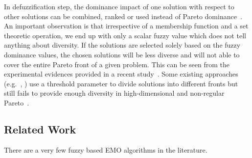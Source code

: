 \documentclass[review]{elsarticle}
\begin{document}
In defuzzification step, the dominance impact of one solution with respect to other solutions can be combined, ranked 
or used instead of Pareto 
dominance~\citep{he2014fuzzy,he2012new,koppen2005fuzzy,farina2004fuzzy,fuzzynasir}. An important observation is that irrespective of a membership function and a set theoretic operation, we end up with only a scalar fuzzy value which does not tell anything about diversity. If the solutions are selected solely based on the fuzzy dominance values, the chosen solutions will be less diverse and will not able to cover the entire Pareto front of a given problem. This can be seen from the experimental evidences provided in a recent study~\citep{sdealgorithm}. Some existing approaches (e.g.~\citep{he2014fuzzy}, \citep{fuzzynasir}) use a threshold parameter to divide solutions into different fronts but still fails to provide enough diversity in high-dimensional and non-regular Pareto~\citep{rectangleproblem}.



\subsection{Related Work}
There are a very few fuzzy based EMO algorithms in the literature. 



\end{document}

